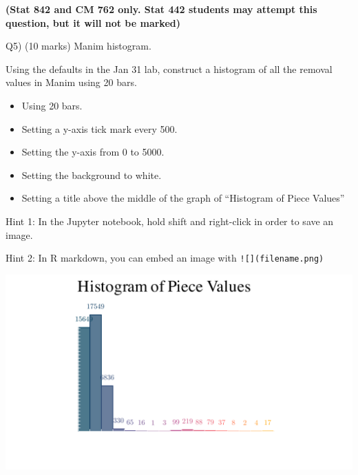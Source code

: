 \documentclass[
]{article}
\providecommand{\tightlist}{%
  \setlength{\itemsep}{0pt}\setlength{\parskip}{0pt}}
\begin{document}
\newpage

\textbf{(Stat 842 and CM 762 only. Stat 442 students may attempt this
question, but it will not be marked)}

Q5) (10 marks) Manim histogram.

Using the defaults in the Jan 31 lab, construct a histogram of all the
removal values in Manim using 20 bars.

\begin{itemize}
\tightlist
\item
  Using 20 bars.
\item
  Setting a y-axis tick mark every 500.
\item
  Setting the y-axis from 0 to 5000.
\item
  Setting the background to white.
\item
  Setting a title above the middle of the graph of ``Histogram of Piece
  Values''
\end{itemize}

Hint 1: In the Jupyter notebook, hold shift and right-click in order to
save an image.

Hint 2: In R markdown, you can embed an image with
\texttt{!{[}{]}(filename.png)}

\includegraphics{Histogram_of_Piece_remove.png}
\end{document}

